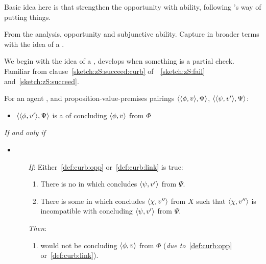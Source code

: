 
\begin{note}
  \color{red}
  Basic idea here is that strengthen the opportunity with ability, following \citeauthor{Austin:1961vz}'s way of putting things.
\end{note}

\begin{note}
  \color{red}
  From the analysis, opportunity and subjunctive ability.
  Capture in broader terms with the idea of a \curb{}.
\end{note}

\begin{note}[\curb{3}]
  We begin with the idea of a \curb{}, develops when something is a partial check.
  Familiar from clause~\autoref{sketch:zS:succeed:curb} of~~\ref{sketch:zS:fail} and~\ref{sketch:zS:succeed}.

  \begin{definition}[A \curb{0}]
    \label{def:curb}
    For an agent \vAgent{}, and proposition-value-premises pairings \(\langle \langle \phi, v \rangle, \Phi \rangle\), \(\langle \langle \psi, v' \rangle, \Psi \rangle\):

    \begin{itemize}
    \item
      \(\langle \langle \phi, v' \rangle, \Psi \rangle\) is a \emph{\curb{}} of concluding \(\langle \phi, v \rangle\) from \(\Phi\)
    \end{itemize}

    \emph{If and only if}

    \begin{itemize}
    \item
        \begin{enumerate}
        \item[\emph{If}:]
          Either~\ref{def:curb:opp} or~\ref{def:curb:link} is true:

          \begin{enumerate}[label=\alph*., ref=(\alph*)]
          \item
            \label{def:curb:opp}
            There is no \pevent{} in which \vAgent{} concludes \(\langle \psi, v' \rangle\) from \(\Psi\).
          \item
            \label{def:curb:link}
            There is some \pevent{} in which \vAgent{} concludes \(\langle \chi, v'' \rangle\) from \(X\) such that \(\langle \chi, v'' \rangle\) is incompatible with concluding \(\langle \psi, v' \rangle\) from \(\Psi\).
          \end{enumerate}
        \item[\emph{Then}:]
          \begin{enumerate}[label=\alph*., ref=(\alph*), resume]
          \item
            \label{def:curb:fail}
            \vAgent{} would not be concluding \(\langle \phi, v \rangle\) from \(\Phi\) (\emph{due to}~\ref{def:curb:opp} or~\ref{def:curb:link}).
          \end{enumerate}
      \end{enumerate}
    \end{itemize}
    \vspace{-\baselineskip}
  \end{definition}


\end{note}
